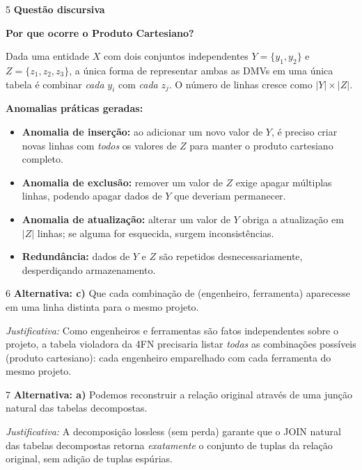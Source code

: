 \documentclass[12pt]{article}
\begin{document}
\vspace{0.5cm}

\begin{gabbox}{5}
\textbf{Questão discursiva}
\end{gabbox}

\begin{respdisc}
\textbf{Por que ocorre o Produto Cartesiano?}

Dada uma entidade $X$ com dois conjuntos independentes $Y = \{y_1, y_2\}$ e $Z = \{z_1, z_2, z_3\}$, a única forma de representar ambas as DMVs em uma única tabela é combinar \emph{cada} $y_i$ com \emph{cada} $z_j$. O número de linhas cresce como $|Y| \times |Z|$.

\medskip
\textbf{Anomalias práticas geradas:}
\begin{itemize}
  \item \textbf{Anomalia de inserção:} ao adicionar um novo valor de $Y$, é preciso criar novas linhas com \emph{todos} os valores de $Z$ para manter o produto cartesiano completo.
  \item \textbf{Anomalia de exclusão:} remover um valor de $Z$ exige apagar múltiplas linhas, podendo apagar dados de $Y$ que deveriam permanecer.
  \item \textbf{Anomalia de atualização:} alterar um valor de $Y$ obriga a atualização em $|Z|$ linhas; se alguma for esquecida, surgem inconsistências.
  \item \textbf{Redundância:} dados de $Y$ e $Z$ são repetidos desnecessariamente, desperdiçando armazenamento.
\end{itemize}
\end{respdisc}

\vspace{0.5cm}

\begin{gabbox}{6}
\textbf{Alternativa: c)} Que cada combinação de (engenheiro, ferramenta) aparecesse em uma linha distinta para o mesmo projeto.

\smallskip
\textit{Justificativa:} Como engenheiros e ferramentas são fatos independentes sobre o projeto, a tabela violadora da 4FN precisaria listar \emph{todas} as combinações possíveis (produto cartesiano): cada engenheiro emparelhado com cada ferramenta do mesmo projeto.
\end{gabbox}

\vspace{0.5cm}

\begin{gabbox}{7}
\textbf{Alternativa: a)} Podemos reconstruir a relação original através de uma junção natural das tabelas decompostas.

\smallskip
\textit{Justificativa:} A decomposição lossless (sem perda) garante que o JOIN natural das tabelas decompostas retorna \emph{exatamente} o conjunto de tuplas da relação original, sem adição de tuplas espúrias.
\end{gabbox}
\end{document}
